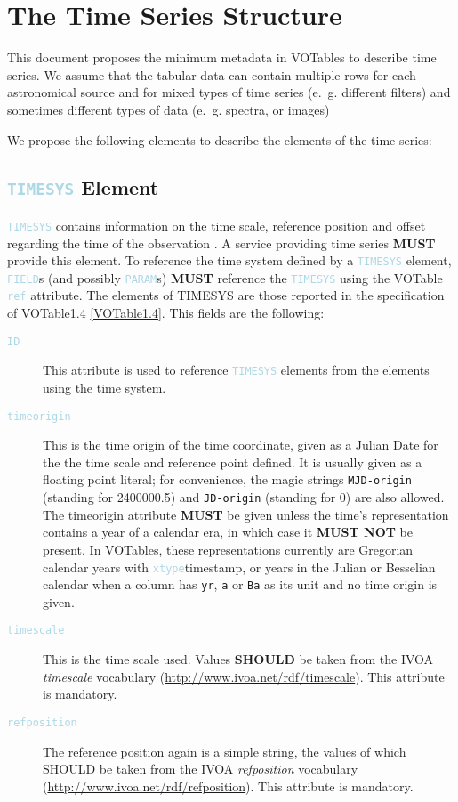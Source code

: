 \documentclass[11pt,a4paper]{ivoa}
\newcommand\elem[1]{\textcolor{LightBlue}{{\tt#1}}}
\begin{document}

\section{The Time Series Structure}
\label{elem:TIMESERIES}
This document proposes the minimum metadata in VOTables to describe time series. We assume that the tabular data can contain multiple rows for each astronomical source and for mixed types of time series (e.~g. different filters) and sometimes different types of data (e.~g. spectra, or images)

We propose the following elements to describe the elements of the time series: 

\subsection{\elem{TIMESYS} Element}
\elem{TIMESYS} contains information on the time scale, reference position and offset regarding the time of the observation \cite{VOTable1.4, TIMESYS}. A service providing time series \textbf{MUST} provide this element. To reference the time system defined by a \elem{TIMESYS} element, \elem{FIELD}s (and possibly \elem{PARAM}s) \textbf{MUST} reference the \elem{TIMESYS} using the VOTable \elem{ref} attribute. The elements of TIMESYS are those reported in the specification of VOTable1.4 \ref{VOTable1.4}. This fields are the following: 

\begin{description}
   \item[\elem{ID}] This attribute is used to reference \elem{TIMESYS} elements from the elements using the time system.
   \item[\elem{timeorigin}] This is the time origin of the time coordinate, given as a Julian Date for the the time scale and reference point
defined.  It is usually given as a floating point literal; for convenience, the magic strings \verb|MJD-origin| (standing
for 2400000.5) and \verb|JD-origin| (standing for 0) are also allowed. The timeorigin attribute \textbf{MUST} be given unless the time's representation contains a year of a calendar era, in which case it \textbf{MUST NOT} be present. In VOTables, these representations currently are Gregorian calendar years with \elem{xtype}{timestamp}, or years in the Julian or Besselian calendar when a column has \verb|yr|, \verb|a| or \verb|Ba| as its unit and no time origin is given. 
   \item[\elem{timescale}] This is the time scale used. Values \textbf{SHOULD} be taken from the IVOA \emph{timescale} vocabulary (\url{http://www.ivoa.net/rdf/timescale}). This attribute is mandatory.
   \item[\elem{refposition}] The reference position again is a simple string, the values of which SHOULD be taken from the IVOA \emph{refposition} vocabulary (\url{http://www.ivoa.net/rdf/refposition}). This attribute is mandatory.
\end{description}
  
\end{document}
